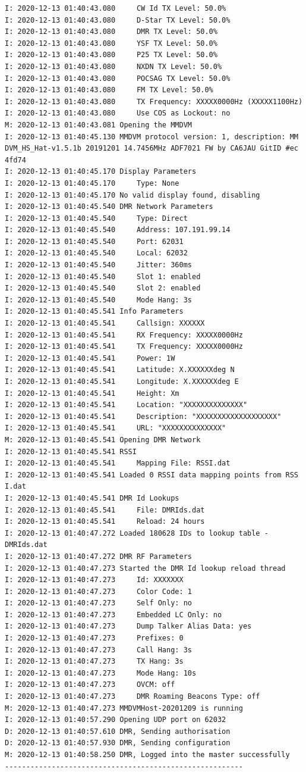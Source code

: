 \documentclass[a4j,oneside]{ujbook}
\begin{document}
\begin{verbatim}
I: 2020-12-13 01:40:43.080     CW Id TX Level: 50.0%
I: 2020-12-13 01:40:43.080     D-Star TX Level: 50.0%
I: 2020-12-13 01:40:43.080     DMR TX Level: 50.0%
I: 2020-12-13 01:40:43.080     YSF TX Level: 50.0%
I: 2020-12-13 01:40:43.080     P25 TX Level: 50.0%
I: 2020-12-13 01:40:43.080     NXDN TX Level: 50.0%
I: 2020-12-13 01:40:43.080     POCSAG TX Level: 50.0%
I: 2020-12-13 01:40:43.080     FM TX Level: 50.0%
I: 2020-12-13 01:40:43.080     TX Frequency: XXXXX0000Hz (XXXXX1100Hz)
I: 2020-12-13 01:40:43.080     Use COS as Lockout: no
M: 2020-12-13 01:40:43.081 Opening the MMDVM
I: 2020-12-13 01:40:45.130 MMDVM protocol version: 1, description: MM
DVM_HS_Hat-v1.5.1b 20191201 14.7456MHz ADF7021 FW by CA6JAU GitID #ec
4fd74
I: 2020-12-13 01:40:45.170 Display Parameters
I: 2020-12-13 01:40:45.170     Type: None
I: 2020-12-13 01:40:45.170 No valid display found, disabling
I: 2020-12-13 01:40:45.540 DMR Network Parameters
I: 2020-12-13 01:40:45.540     Type: Direct
I: 2020-12-13 01:40:45.540     Address: 107.191.99.14
I: 2020-12-13 01:40:45.540     Port: 62031
I: 2020-12-13 01:40:45.540     Local: 62032
I: 2020-12-13 01:40:45.540     Jitter: 360ms
I: 2020-12-13 01:40:45.540     Slot 1: enabled
I: 2020-12-13 01:40:45.540     Slot 2: enabled
I: 2020-12-13 01:40:45.540     Mode Hang: 3s
I: 2020-12-13 01:40:45.541 Info Parameters
I: 2020-12-13 01:40:45.541     Callsign: XXXXXX
I: 2020-12-13 01:40:45.541     RX Frequency: XXXXX0000Hz
I: 2020-12-13 01:40:45.541     TX Frequency: XXXXX0000Hz
I: 2020-12-13 01:40:45.541     Power: 1W
I: 2020-12-13 01:40:45.541     Latitude: X.XXXXXXdeg N
I: 2020-12-13 01:40:45.541     Longitude: X.XXXXXXdeg E
I: 2020-12-13 01:40:45.541     Height: Xm
I: 2020-12-13 01:40:45.541     Location: "XXXXXXXXXXXXXX"
I: 2020-12-13 01:40:45.541     Description: "XXXXXXXXXXXXXXXXXXX"
I: 2020-12-13 01:40:45.541     URL: "XXXXXXXXXXXXXX"
M: 2020-12-13 01:40:45.541 Opening DMR Network
I: 2020-12-13 01:40:45.541 RSSI
I: 2020-12-13 01:40:45.541     Mapping File: RSSI.dat
I: 2020-12-13 01:40:45.541 Loaded 0 RSSI data mapping points from RSS
I.dat
I: 2020-12-13 01:40:45.541 DMR Id Lookups
I: 2020-12-13 01:40:45.541     File: DMRIds.dat
I: 2020-12-13 01:40:45.541     Reload: 24 hours
I: 2020-12-13 01:40:47.272 Loaded 180628 IDs to lookup table - DMRIds.dat
I: 2020-12-13 01:40:47.272 DMR RF Parameters
I: 2020-12-13 01:40:47.273 Started the DMR Id lookup reload thread
I: 2020-12-13 01:40:47.273     Id: XXXXXXX
I: 2020-12-13 01:40:47.273     Color Code: 1
I: 2020-12-13 01:40:47.273     Self Only: no
I: 2020-12-13 01:40:47.273     Embedded LC Only: no
I: 2020-12-13 01:40:47.273     Dump Talker Alias Data: yes
I: 2020-12-13 01:40:47.273     Prefixes: 0
I: 2020-12-13 01:40:47.273     Call Hang: 3s
I: 2020-12-13 01:40:47.273     TX Hang: 3s
I: 2020-12-13 01:40:47.273     Mode Hang: 10s
I: 2020-12-13 01:40:47.273     OVCM: off
I: 2020-12-13 01:40:47.273     DMR Roaming Beacons Type: off
M: 2020-12-13 01:40:47.273 MMDVMHost-20201209 is running
I: 2020-12-13 01:40:57.290 Opening UDP port on 62032
D: 2020-12-13 01:40:57.610 DMR, Sending authorisation
D: 2020-12-13 01:40:57.930 DMR, Sending configuration
M: 2020-12-13 01:40:58.250 DMR, Logged into the master successfully
--------------------------------------------------------
\end{verbatim}
\end{document}
